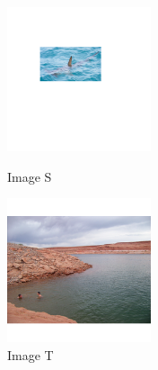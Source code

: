 \documentclass{article}
\begin{document}
\begin{figure}[!htb]
   \begin{minipage}{0.5\textwidth}
     \centering
     \includegraphics[width = 120pt]{Annexe/requin.png}
     \caption{Image S}
      \end{minipage}\hfill
   \begin{minipage}{0.33\textwidth}
     \centering
     \includegraphics[width = 120pt]{Annexe/ocean.png}
     \caption{Image T}
      \end{minipage}\hfill
      \end{figure}
\end{document}
